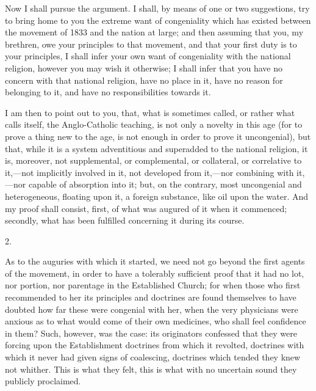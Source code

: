 Now I shall pursue the argument. I shall, by means of one or two
suggestions, try to bring home to you the extreme want of congeniality
which has existed between the movement of 1833 and the nation at
large; and then assuming that you, my brethren, owe your principles to
that movement, and that your first duty is to your principles, I shall
infer your own want of congeniality with the national religion,
however you may wish it otherwise; I shall infer that you have no
concern with that national religion, have no place in it, have no
reason for belonging to it, and have no responsibilities towards it.

I am then to point out to you, that, what is sometimes called, or
rather what calls itself, the Anglo-Catholic teaching, is not only a
novelty in this age (for to prove a thing new to the age, is not
enough in order to prove it uncongenial), but that, while it is a
system adventitious and superadded to the national religion, it is,
moreover, not supplemental, or complemental, or collateral, or
correlative to it,—not implicitly involved in it, not developed from
it,—nor combining with it,—nor capable of absorption into it; but,
on the contrary, most uncongenial and heterogeneous, floating upon it,
a foreign substance, like oil upon the water. And my proof shall
consist, first, of what was augured of it when it commenced; secondly,
what has been fulfilled concerning it during its course.

2.

As to the auguries with which it started, we need not go beyond the
first agents of the movement, in order to have a tolerably sufficient
proof that it had no lot, nor portion, nor parentage in the
Established Church; for when those who first recommended to her its
principles and doctrines are found themselves to have doubted how far
these were congenial with her, when the very physicians were anxious
as to what would come of their own medicines, who shall feel
confidence in them? Such, however, was the case: its originators
confessed that they were forcing upon the Establishment doctrines from
which it revolted, doctrines with which it never had given signs of
coalescing, doctrines which tended they knew not whither. This is what
they felt, this is what with no uncertain sound they publicly
proclaimed.

